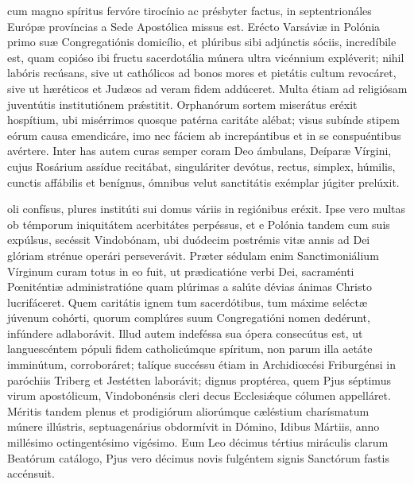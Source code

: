 \documentclass[fontsize=9pt,paper=A6,twoside,BCOR=1mm,DIV=22,headinclude]{scrarticle}
\begin{document}
\begin{multicols}{2}
{\RVCiv 


 cum magno spíritus fervóre tirocínio ac présbyter factus, in septentrionáles Európæ províncias a Sede Apostólica missus est. Erécto Varsáviæ in Polónia primo suæ Congregatiónis domicílio, et plúribus sibi adjúnctis sóciis, incredíbile est, quam copióso ibi fructu sacerdotália múnera ultra vicénnium expléverit; nihil labóris recúsans, sive ut cathólicos ad bonos mores et pietátis cultum revocáret, sive ut hæréticos et Judæos ad veram fidem addúceret. Multa étiam ad religiósam juventútis institutiónem pr\'æstitit. Orphanórum sortem miserátus eréxit hospítium, ubi misérrimos quosque patérna caritáte alébat; visus subínde stipem eórum causa emendicáre, imo nec fáciem ab increpántibus et in se conspuéntibus avértere. Inter has autem curas semper coram Deo ámbulans, Deíparæ Vírgini, cujus Rosárium assídue recitábat, singuláriter devótus, rectus, simplex, húmilis, cunctis affábilis et benígnus, ómnibus velut sanctitátis exémplar júgiter prelúxit.

\RVCv 

 oli confísus, plures institúti sui domus váriis in regiónibus eréxit. Ipse vero multas ob témporum iniquitátem acerbitátes perpéssus, et e Polónia tandem cum suis expúlsus, secéssit Vindobónam, ubi duódecim postrémis vitæ annis ad Dei glóriam strénue operári perseverávit. Præter sédulam enim Sanctimoniálium Vírginum curam totus in eo fuit, ut prædicatióne verbi Dei, sacraménti Pœniténtiæ administratióne quam plúrimas a salúte dévias ánimas Christo lucrifáceret. Quem caritátis ignem tum sacerdótibus, tum máxime seléctæ júvenum cohórti, quorum complúres suum Congregatióni nomen dedérunt, infúndere adlaborávit. Illud autem indeféssa sua ópera consecútus est, ut languescéntem pópuli fidem catholicúmque spíritum, non parum illa aetáte imminútum, corroboráret; talíque succéssu étiam in Archidiœcési Friburgénsi in paróchiis Triberg et Jestétten laborávit; dignus proptérea, quem Pjus séptimus virum apostólicum, Vindobonénsis cleri decus Ecclesi\'æque cólumen appelláret. Méritis tandem plenus et prodigiórum aliorúmque cæléstium charísmatum múnere illústris, septuagenárius obdormívit in Dómino, Idibus Mártiis, anno millésimo octingentésimo vigésimo. Eum Leo décimus tértius miráculis clarum Beatórum catálogo, Pjus vero décimus novis fulgéntem signis Sanctórum fastis accénsuit.

\RVCvi 


}
\end{multicols}
\end{document}
